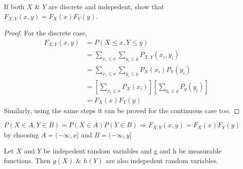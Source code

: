 \documentclass{article}
\begin{document}
If both $X$ \& $Y$ are discrete and indepedent, show that $F_{X,Y}(x,y)= F_X (x) F_Y (y)$.
\begin{proof}
    For the discrete case,
    \begin{align*}
        F_{X,Y}(x,y)&= P(X \leq x, Y \leq y) \\
        &= \sum_{x_i \leq x} \sum_{y_i \leq y} P_{X,Y}(x_i,y_i) \\
        &= \sum_{x_i \leq x} \sum_{y_i \leq y} P_{X}(x_i) P_Y(y_i) \\
        &= \left[ \sum_{x_i \leq x} P_{X}(x_i)\right] \left[ \sum_{y_i \leq y} P_{y}(y_i)\right] \\
        &= F_X (x) F_Y (y)
    \end{align*}
    Similarly, using the same steps it can be proved for the continuous case too.
\end{proof}

$P(X \in A , Y \in B)= P(X \in A) P(Y \in B) \Rightarrow F_{X,Y}(x,y)= F_X (x) F_Y(y)$ by choosing $A= (-\infty,x]$ and $B=(-\infty,y]$

\begin{lemma}
    Let $X$ and $Y$ be indepedent random variables and g and h be measurable functions. Then $g(X)$ \& $h(Y)$ are also indepedent random variables.
\end{lemma}
\end{document}
